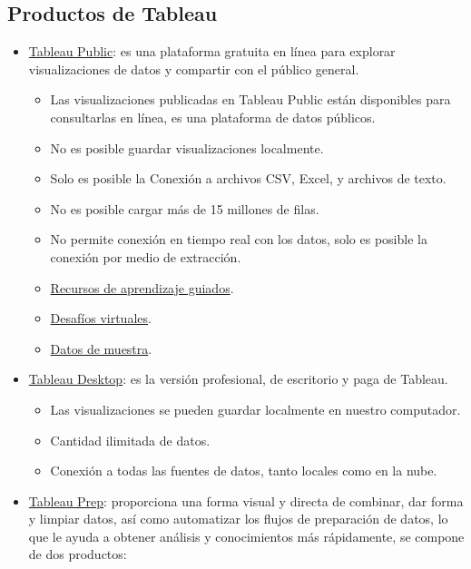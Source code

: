\documentclass[
]{book}
\providecommand{\tightlist}{%
  \setlength{\itemsep}{0pt}\setlength{\parskip}{0pt}}
\begin{document}
\hypertarget{productos-de-tableau}{%
\subsection{Productos de Tableau}\label{productos-de-tableau}}

\begin{itemize}
\item
  \href{https://public.tableau.com/en-us/s/}{Tableau Public}: es una plataforma gratuita en línea para explorar visualizaciones de datos y compartir con el público general.

  \begin{itemize}
  \tightlist
  \item
    Las visualizaciones publicadas en Tableau Public están disponibles para consultarlas en línea, es una plataforma de datos públicos.
  \item
    No es posible guardar visualizaciones localmente.
  \item
    Solo es posible la Conexión a archivos CSV, Excel, y archivos de texto.
  \item
    No es posible cargar más de 15 millones de filas.
  \item
    No permite conexión en tiempo real con los datos, solo es posible la conexión por medio de extracción.
  \item
    \href{https://public.tableau.com/es-es/s/resources}{Recursos de aprendizaje guiados}.
  \item
    \href{https://public.tableau.com/es-es/s/resources}{Desafíos virtuales}.
  \item
    \href{https://public.tableau.com/es-es/s/resources}{Datos de muestra}.
  \end{itemize}
\item
  \href{https://www.tableau.com/products/desktop}{Tableau Desktop}: es la versión profesional, de escritorio y paga de Tableau.

  \begin{itemize}
  \tightlist
  \item
    Las visualizaciones se pueden guardar localmente en nuestro computador.
  \item
    Cantidad ilimitada de datos.
  \item
    Conexión a todas las fuentes de datos, tanto locales como en la nube.
  \end{itemize}
\item
  \href{https://www.tableau.com/trial/tableau-prep?utm_campaign_id=2017049\&utm_campaign=Prospecting-CORE-ALL-ALL-ALL-ALL\&utm_medium=Paid+Search\&utm_source=Google+Search\&utm_language=EN\&utm_country=RoLAC\&kw=\%2Btableau\%20\%2Bprep\&adgroup=CTX-Brand-Tableau+Prep-EN-B\&adused=335523927259\&matchtype=b\&placement=\&gclid=CjwKCAjw0On8BRAgEiwAincsHMNUqIicWtve96Be3NVOstpKxXYHS87VxJn-dxW5W3dLcqPzrbZDjRoClTkQAvD_BwE\&gclsrc=aw.ds}{Tableau Prep}: proporciona una forma visual y directa de combinar, dar forma y limpiar datos, así como automatizar los flujos de preparación de datos, lo que le ayuda a obtener análisis y conocimientos más rápidamente, se compone de dos productos:


\end{itemize}
\end{document}
